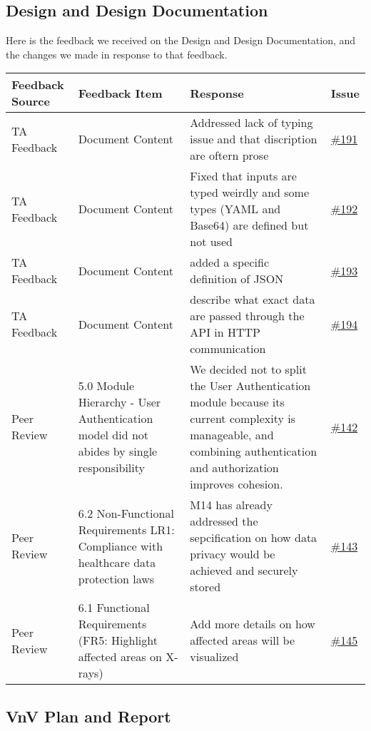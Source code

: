 \documentclass{article}
\begin{document}
\subsection{Design and Design Documentation}

Here is the feedback we received on the Design and Design Documentation, and the changes we made in response to that feedback.
\begin{longtable}{| p{} | p{} | p{} | p{} |}
\hline
\textbf{Feedback Source} & \textbf{Feedback Item} & \textbf{Response} & \textbf{Issue} \\
\hline
TA Feedback & Document Content & Addressed lack of typing issue and that discription are oftern prose  & \href{https://github.com/RezaJodeiri/CXR-Capstone/issues/191}{\#191} \\
\hline
TA Feedback & Document Content & Fixed that inputs are typed weirdly and some types (YAML and Base64) are defined but not used & \href{https://github.com/RezaJodeiri/CXR-Capstone/issues/192}{\#192} \\
\hline
TA Feedback & Document Content & added a specific definition of JSON & \href{https://github.com/RezaJodeiri/CXR-Capstone/issues/193}{\#193} \\
\hline
TA Feedback & Document Content & describe what exact data are passed through the API in HTTP communication & \href{https://github.com/RezaJodeiri/CXR-Capstone/issues/194}{\#194} \\
\hline
Peer Review & 5.0 Module Hierarchy - User Authentication model did not abides by single responsibility & We decided not to split the User Authentication module because its current complexity is manageable, and combining authentication and authorization improves cohesion. &\href{https://github.com/RezaJodeiri/CXR-Capstone/issues/142}{\#142}\\
\hline
Peer Review & 6.2 Non-Functional Requirements LR1: Compliance with healthcare data protection laws & M14 has already addressed the sepcification on how data privacy would be achieved and securely stored & \href{https://github.com/RezaJodeiri/CXR-Capstone/issues/143}{\#143}\\
\hline
Peer Review & 6.1 Functional Requirements (FR5: Highlight affected areas on X-rays) & Add more details on how affected areas will be visualized & \href{https://github.com/RezaJodeiri/CXR-Capstone/issues/145}{\#145}
\hline
\end{longtable}

\subsection{VnV Plan and Report}
\end{document}
